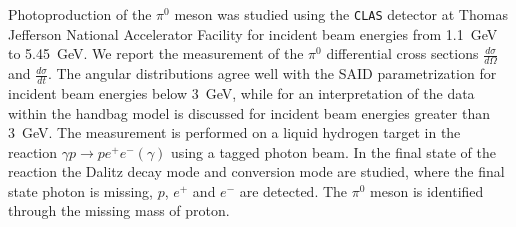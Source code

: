 \documentclass[12pt,a4paper]{report}
\author{Michael C. Kunkel}
\begin{document}
Photoproduction of the $\pi^0$ meson was studied using the \textsc{\texttt{CLAS}} detector at Thomas Jefferson National Accelerator Facility for incident beam energies from 1.1~GeV to 5.45~GeV. We report the measurement of the $\pi^0$ differential cross sections $\frac{d\sigma}{d\Omega}$ and $\frac{d\sigma}{dt}$. The angular distributions agree well with the SAID parametrization for incident beam energies below 3~GeV, while for an interpretation of the data within the handbag model is discussed for incident beam energies greater than 3~GeV. The measurement is performed on a liquid hydrogen target in the reaction $\gamma p\to pe^+e^-(\gamma)$ using a tagged photon beam. In the final state of the reaction the Dalitz decay mode and conversion mode are studied, where the final state photon is missing, $p$, $e^+$ and $e^-$ are detected. The $\pi^0$ meson is identified through the missing mass of proton.
\end{document}
